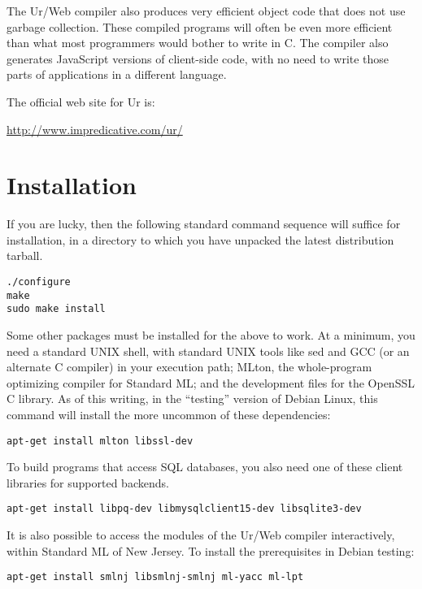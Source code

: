 \documentclass{article}
\begin{document}
The Ur/Web compiler also produces very efficient object code that does not use garbage collection.  These compiled programs will often be even more efficient than what most programmers would bother to write in C.  The compiler also generates JavaScript versions of client-side code, with no need to write those parts of applications in a different language.

\medskip

The official web site for Ur is:
\begin{center}
  \url{http://www.impredicative.com/ur/}
\end{center}


\section{Installation}

If you are lucky, then the following standard command sequence will suffice for installation, in a directory to which you have unpacked the latest distribution tarball.

\begin{verbatim}
./configure
make
sudo make install
\end{verbatim}

Some other packages must be installed for the above to work.  At a minimum, you need a standard UNIX shell, with standard UNIX tools like sed and GCC (or an alternate C compiler) in your execution path; MLton, the whole-program optimizing compiler for Standard ML; and the development files for the OpenSSL C library.  As of this writing, in the ``testing'' version of Debian Linux, this command will install the more uncommon of these dependencies:
\begin{verbatim}
apt-get install mlton libssl-dev
\end{verbatim}

To build programs that access SQL databases, you also need one of these client libraries for supported backends.
\begin{verbatim}
apt-get install libpq-dev libmysqlclient15-dev libsqlite3-dev
\end{verbatim}

It is also possible to access the modules of the Ur/Web compiler interactively, within Standard ML of New Jersey.  To install the prerequisites in Debian testing:
\begin{verbatim}
apt-get install smlnj libsmlnj-smlnj ml-yacc ml-lpt
\end{verbatim}
\end{document}
